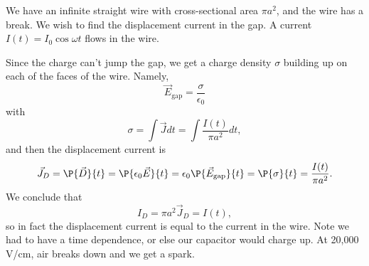 \begin{exm}
    We have an infinite straight wire with cross-sectional area $\pi a^2$, and the wire has a break. We wish to find the displacement current in the gap. A current $I(t)=I_0 \cos \omega t$ flows in the wire.
    
    Since the charge can't jump the gap, we get a charge density $\sigma$ building up on each of the faces of the wire. Namely,
    \begin{equation}
        \vec E_\text{gap} = \frac{\sigma}{\epsilon_0}
    \end{equation}
    with
    \begin{equation}
        \sigma = \int \vec J dt = \int \frac{I(t)}{\pi a^2} dt,
    \end{equation}
    and then the displacement current is
    \begin{equation}
        \vec J_D = \P{\vec D}{t} = \P{\epsilon_0 \vec E}{t} = \epsilon_0 \P{\vec E_\text{gap}}{t} = \P{\sigma}{t} =\frac{I(t)}{\pi a^2}.
    \end{equation}
    We conclude that
    \begin{equation}
        I_D = \pi a^2 \vec J_D = I(t),
    \end{equation}
    so in fact the displacement current is equal to the current in the wire. Note we had to have a time dependence, or else our capacitor would charge up. At 20,000 V/cm, air breaks down and we get a spark.
\end{exm}

